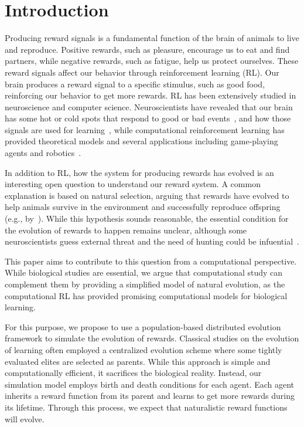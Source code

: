 \section{Introduction}\label{sec:intro}
Producing reward signals is a fundamental function of the brain of animals to live and reproduce. Positive rewards, such as pleasure, encourage us to eat and find partners, while negative rewards, such as fatigue, help us protect ourselves. These reward signals affect our behavior through reinforcement learning (RL). Our brain produces a reward signal to a specific stimulus, such as good food, reinforcing our behavior to get more rewards. RL has been extensively studied in neuroscience and computer science. Neuroscientists have revealed that our brain has some hot or cold spots that respond to good or bad events~\citep{berridgeAffectiveNeurosciencePleasure2008}, and how those signals are used for learning~\citep{schultzNeuronalRewardDecision2015}, while computational reinforcement learning has provided theoretical models and several applications including game-playing agents and robotics~\citep{suttonReinforcementLearningIntroduction2018}.

In addition to RL, how the system for producing rewards has evolved is an interesting open question to understand our reward system. A common explanation is based on natural selection, arguing that rewards have evolved to help animals survive in the environment and successfully reproduce offspring (e.g., by~\cite{schultzNeuronalRewardDecision2015}). While this hypothesis sounds reasonable, the essential condition for the evolution of rewards to happen remains unclear, although some neuroscientists guess external threat and the need of hunting could be infuential~\citep{ledouxSoonThereWas2022a}.

This paper aims to contribute to this question from a computational perspective. While biological studies are essential, we argue that computational study can complement them by providing a simplified model of natural evolution, as the computational RL has provided promising computational models for biological learning.

For this purpose, we propose to use a population-based distributed evolution framework to simulate the evolution of rewards. Classical studies on the evolution of learning \citep{hintonHowLearningCan1987,singhWhereRewardsCome2009} often employed a centralized evolution scheme where some tightly evaluated elites are selected as parents. While this approach is simple and computationally efficient, it sacrifices the biological reality. Instead, our simulation model employs birth and death conditions for each agent. Each agent inherits a reward function from its parent and learns to get more rewards during its lifetime. Through this process, we expect that naturalistic reward functions will evolve.

